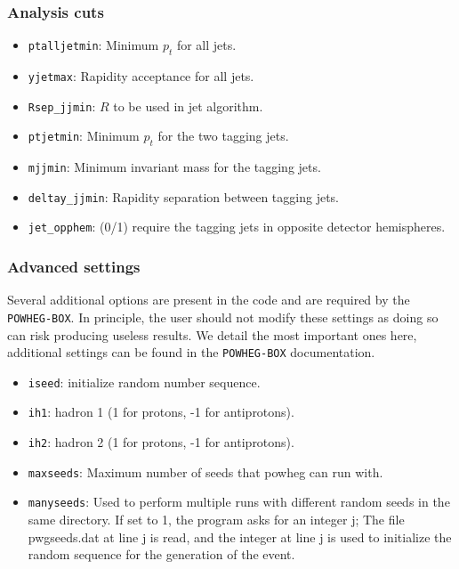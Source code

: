 \documentclass[12pt,a4]{article}
\begin{document}
\subsubsection{Analysis cuts}
\begin{itemize}
\item\texttt{ptalljetmin}: Minimum $p_t$ for all jets.

\item\texttt{yjetmax}: Rapidity acceptance for all jets.

\item\texttt{Rsep\_jjmin}: $R$ to be used in jet algorithm.

\item\texttt{ptjetmin}: Minimum $p_t$ for the two tagging jets.

\item\texttt{mjjmin}: Minimum invariant mass for the tagging jets.

\item\texttt{deltay\_jjmin}: Rapidity separation between tagging jets.

\item\texttt{jet\_opphem}: (0/1) require the tagging jets in opposite
  detector hemispheres.
\end{itemize}

\subsubsection{Advanced settings}
Several additional options are present in the code and are required by
the \texttt{POWHEG-BOX}.
%
In principle, the user should not modify these settings as doing so
can risk producing useless results.
%
We detail the most important ones here, additional settings can be
found in the \texttt{POWHEG-BOX} documentation.
\begin{itemize}  
\item\texttt{iseed}: initialize random number sequence.
  
\item\texttt{ih1}: hadron 1 (1 for protons, -1 for antiprotons).
  
\item\texttt{ih2}: hadron 2 (1 for protons, -1 for antiprotons).

\item\texttt{maxseeds}: Maximum number of seeds that powheg can run
  with.

\item\texttt{manyseeds}: Used to perform multiple runs with different
  random seeds in the same directory.  If set to 1, the program asks
  for an integer j; The file pwgseeds.dat at line j is read, and the
  integer at line j is used to initialize the random sequence for the
  generation of the event.
                 
\end{itemize}
\end{document}
